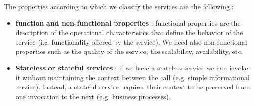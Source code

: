 \documentclass[11pt]{article}
\begin{document}
The properties according to which we classify the services are the following :
\begin{itemize}
\item \textbf{function and non-functional properties} : functional properties are the description of the operational characteristics that define the behavior of the service (i.e. functionality offered by the service). We need also non-functional properties such as the quality of the service, the scalability, availability, etc.
\item \textbf{Stateless or stateful services} : if we have a stateless service we can invoke it without maintaining the context between the call (e.g. simple informational service). Instead, a stateful service requires their context to be preserved from one invocation to the next (e.g. business processes).
\end{itemize}
\end{document}
